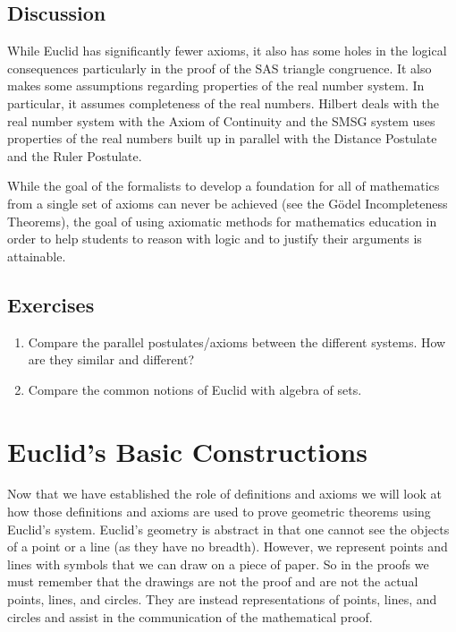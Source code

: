 \documentclass[
]{book}
\theoremstyle{definition}
\theoremstyle{definition}
\theoremstyle{definition}
\theoremstyle{definition}
\theoremstyle{remark}
\begin{document}
\hypertarget{discussion}{%
\subsection{Discussion}\label{discussion}}

While Euclid has significantly fewer axioms, it also has some holes in the logical consequences particularly in the proof of the SAS triangle congruence. It also makes some assumptions regarding properties of the real number system. In particular, it assumes completeness of the real numbers. Hilbert deals with the real number system with the Axiom of Continuity and the SMSG system uses properties of the real numbers built up in parallel with the Distance Postulate and the Ruler Postulate.

While the goal of the formalists to develop a foundation for all of mathematics from a single set of axioms can never be achieved (see the Gödel Incompleteness Theorems), the goal of using axiomatic methods for mathematics education in order to help students to reason with logic and to justify their arguments is attainable.

\hypertarget{exercises-37}{%
\subsection{Exercises}\label{exercises-37}}

\begin{enumerate}
\def\labelenumi{\arabic{enumi}.}
\item
  Compare the parallel postulates/axioms between the different systems. How are they similar and different?
\item
  Compare the common notions of Euclid with algebra of sets.
\end{enumerate}

\hypertarget{euclids-basic-constructions}{%
\section{Euclid's Basic Constructions}\label{euclids-basic-constructions}}

Now that we have established the role of definitions and axioms we will look at how those definitions and axioms are used to prove geometric theorems using Euclid's system. Euclid's geometry is abstract in that one cannot see the objects of a point or a line (as they have no breadth). However, we represent points and lines with symbols that we can draw on a piece of paper. So in the proofs we must remember that the drawings are not the proof and are not the actual points, lines, and circles. They are instead representations of points, lines, and circles and assist in the communication of the mathematical proof.
\end{document}
